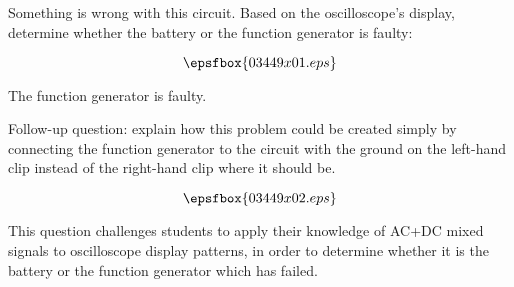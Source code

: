 

Something is wrong with this circuit.  Based on the oscilloscope's display, determine whether the battery or the function generator is faulty:

$$\epsfbox{03449x01.eps}$$







The function generator is faulty.

\vskip 10pt

Follow-up question: explain how this problem could be created simply by connecting the function generator to the circuit with the ground on the left-hand clip instead of the right-hand clip where it should be.

$$\epsfbox{03449x02.eps}$$







This question challenges students to apply their knowledge of AC+DC mixed signals to oscilloscope display patterns, in order to determine whether it is the battery or the function generator which has failed.




